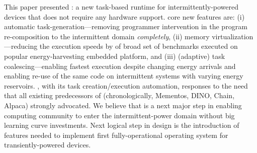This paper presented \sys: a new task-based runtime for intermittently-powered devices that does not require any hardware support. \sys core new features are: (i) automatic task-generation---removing programmer intervention in the program re-composition to the intermittent domain \emph{completely}, (ii) memory virtualization---reducing the execution speeds by  of broad set of benchmarks executed on popular energy-harvesting embedded platform, and (iii) (adaptive) task coalescing---enabling fastest execution  despite changing energy arrivals and enabling re-use of the same code on intermittent systems with varying energy reservoirs. \sys, with its task creation/execution automation, responses to the need that all existing predecessors of \sys (chronologically, Mementos, DINO, Chain, Alpaca) strongly advocated. We believe that \sys is a next major step in enabling computing community to enter the intermittent-power domain without big learning curve investments. Next logical step in \sys design is the introduction of features needed to implement first fully-operational operating system for transiently-powered devices. 
